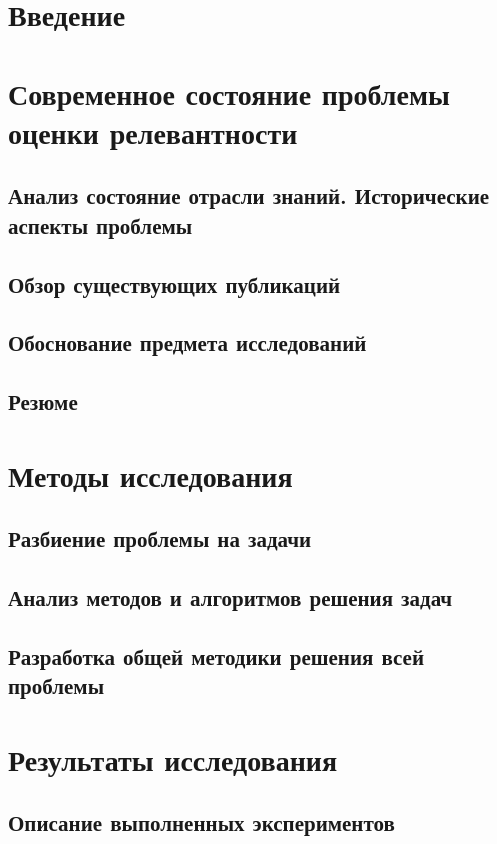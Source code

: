 \documentclass[a4paper,14pt,oneside,openany]{memoir}
\begin{document}
\sloppy

\tableofcontents*
\chapter*{Введение}

\chapter{Современное состояние проблемы оценки релевантности}
\section{Анализ состояние отрасли знаний. Исторические аспекты проблемы}

\section{Обзор существующих публикаций}

\section{Обоснование предмета исследований}

\section{Резюме}

\chapter{Методы исследования}

\section{Разбиение проблемы на задачи}

\section{Анализ методов и алгоритмов решения задач}

\section{Разработка общей методики решения всей проблемы}

\chapter{Результаты исследования}
\section{Описание выполненных экспериментов}

\end{document}
